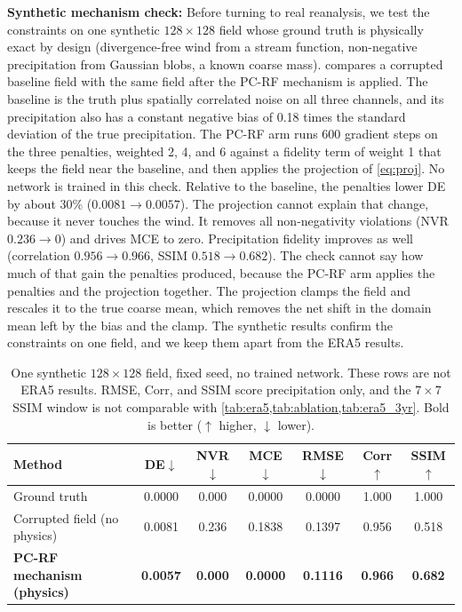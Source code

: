 \documentclass[sigconf,nonacm]{acmart}
\newcommand{\pcrf}{\textsc{PC-RF}\xspace}
\begin{document}
\textbf{Synthetic mechanism check:} Before turning to real reanalysis, we test the constraints on one synthetic $128 \times 128$ field whose ground truth is physically exact by design (divergence-free wind from a stream function, non-negative precipitation from Gaussian blobs, a known coarse mass).  compares a corrupted baseline field with the same field after the \pcrf mechanism is applied. The baseline is the truth plus spatially correlated noise on all three channels, and its precipitation also has a constant negative bias of 0.18 times the standard deviation of the true precipitation. The \pcrf arm runs 600 gradient steps on the three penalties, weighted 2, 4, and 6 against a fidelity term of weight 1 that keeps the field near the baseline, and then applies the projection of \cref{eq:proj}. No network is trained in this check. Relative to the baseline, the penalties lower DE by about 30\% ($0.0081\to0.0057$). The projection cannot explain that change, because it never touches the wind. It removes all non-negativity violations (NVR $0.236\to0$) and drives MCE to zero. Precipitation fidelity improves as well (correlation $0.956\to0.966$, SSIM $0.518\to0.682$). The check cannot say how much of that gain the penalties produced, because the \pcrf arm applies the penalties and the projection together. The projection clamps the field and rescales it to the true coarse mean, which removes the net shift in the domain mean left by the bias and the clamp. The synthetic results confirm the constraints on one field, and we keep them apart from the ERA5 results.

\begin{table}[t]
\caption{One synthetic $128 \times 128$ field, fixed seed, no trained network. These rows are not ERA5 results. RMSE, Corr, and SSIM score precipitation only, and the $7 \times 7$ SSIM window is not comparable with \cref{tab:era5,tab:ablation,tab:era5_3yr}. Bold is better ($\uparrow$ higher, $\downarrow$ lower).}
\label{tab:synthetic}
\centering
\begin{tabular}{lcccccc}
\toprule
\textbf{Method} & DE$\downarrow$ & NVR$\downarrow$ & MCE$\downarrow$ & RMSE$\downarrow$ & Corr$\uparrow$ & SSIM$\uparrow$ \\
\midrule
Ground truth & 0.0000 & 0.000 & 0.0000 & 0.0000 & 1.000 & 1.000 \\
Corrupted field (no physics) & 0.0081 & 0.236 & 0.1838 & 0.1397 & 0.956 & 0.518 \\
\textbf{\pcrf mechanism (physics)} & \textbf{0.0057} & \textbf{0.000} & \textbf{0.0000} & \textbf{0.1116} & \textbf{0.966} & \textbf{0.682} \\
\bottomrule
\end{tabular}
\end{table}
\end{document}

